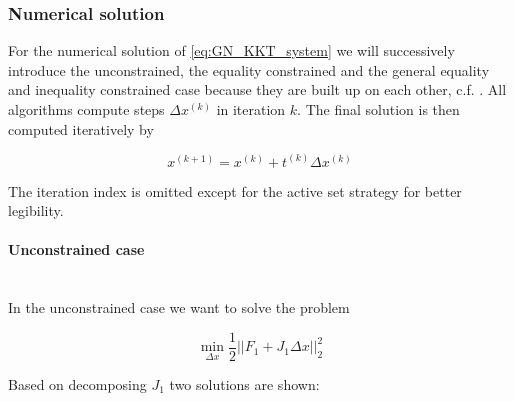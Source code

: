 \documentclass{scrartcl}[12pt, halfparskip]
\numberwithin{equation}{section}
\numberwithin{figure}{section}
\numberwithin{table}{section}
\begin{document}
\subsubsection{Numerical solution}
For the numerical solution of \eqref{eq:GN_KKT_system} we will successively introduce the unconstrained, the equality constrained and the general equality and inequality constrained case because they are built up on each other, c.f. \cite{numerical_methods_lsq_Bjorck}. All algorithms compute steps $\Delta x^{(k)}$ in iteration $k$. The final solution is then computed iteratively by

\begin{equation}
	x^{(k+1)} = x^{(k)} + t^{(k)} \Delta x^{(k)}
\end{equation}

The iteration index is omitted except for the active set strategy for better legibility.

\paragraph{Unconstrained case}\mbox{}\\
In the unconstrained case we want to solve the problem

\begin{equation}
\min_{\Delta x} \frac{1}{2} || F_1 + J_1 \Delta x ||_2^2
\label{eq:numerical_solution_LSQ}
\end{equation}

Based on decomposing $J_1$ two solutions are shown:
\end{document}
